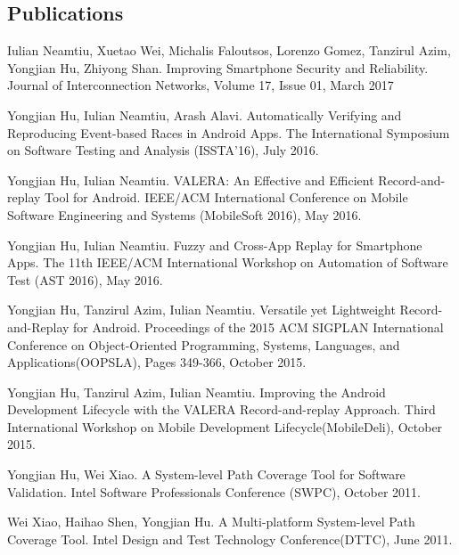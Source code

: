 \documentclass[margin,line]{res}
\begin{document}
\begin{resume}
\section{\sc Publications}

Iulian Neamtiu, Xuetao Wei, Michalis Faloutsos, Lorenzo Gomez, Tanzirul Azim, Yongjian Hu, Zhiyong Shan.
Improving Smartphone Security and Reliability.
Journal of Interconnection Networks, Volume 17, Issue 01, March 2017

Yongjian Hu, Iulian Neamtiu, Arash Alavi. Automatically Verifying and Reproducing Event-based Races in Android Apps.
The International Symposium on Software Testing and Analysis (ISSTA'16), July 2016.

Yongjian Hu, Iulian Neamtiu. VALERA: An Effective and Efficient Record-and-replay Tool for Android.
IEEE/ACM International Conference on Mobile Software Engineering and Systems (MobileSoft 2016), May 2016.

Yongjian Hu, Iulian Neamtiu. Fuzzy and Cross-App Replay for Smartphone Apps.
The 11th IEEE/ACM International Workshop on Automation of Software Test (AST 2016), May 2016.

Yongjian Hu, Tanzirul Azim, Iulian Neamtiu. Versatile yet Lightweight Record-and-Replay for Android.
Proceedings of the 2015 ACM SIGPLAN International Conference on Object-Oriented Programming, Systems, Languages, and Applications(OOPSLA),
Pages 349-366, October 2015.

Yongjian Hu, Tanzirul Azim, Iulian Neamtiu. Improving the Android Development Lifecycle with the VALERA Record-and-replay Approach.
Third International Workshop on Mobile Development Lifecycle(MobileDeli), October 2015.


Yongjian Hu, Wei Xiao. A System-level Path Coverage Tool for Software Validation.
Intel Software Professionals Conference (SWPC), October 2011.

Wei Xiao, Haihao Shen, Yongjian Hu. A Multi-platform System-level Path Coverage Tool.
Intel Design and Test Technology Conference(DTTC), June 2011.






\end{resume}
\end{document}
